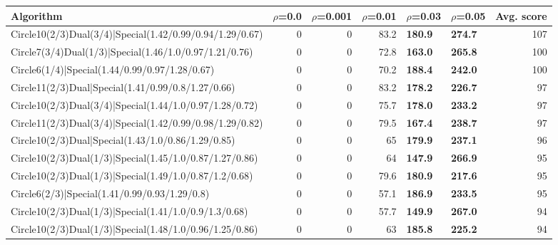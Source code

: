 \begin{tabular}{lrrrllr}
\hline
 Algorithm                                                      &   $\rho$=0.0 &   $\rho$=0.001 &   $\rho$=0.01 & $\rho$=0.03    & $\rho$=0.05    &   Avg. score \\
\hline
 Circle10(2/3)Dual(3/4)|Special(1.42/0.99/0.94/1.29/0.67)       &          0   &            0   &          83.2 & \textbf{180.9} & \textbf{274.7} &          107 \\
 Circle7(3/4)Dual(1/3)|Special(1.46/1.0/0.97/1.21/0.76)         &          0   &            0   &          72.8 & \textbf{163.0} & \textbf{265.8} &          100 \\
 Circle6(1/4)|Special(1.44/0.99/0.97/1.28/0.67)                 &          0   &            0   &          70.2 & \textbf{188.4} & \textbf{242.0} &          100 \\
 Circle11(2/3)Dual|Special(1.41/0.99/0.8/1.27/0.66)             &          0   &            0   &          83.2 & \textbf{178.2} & \textbf{226.7} &           97 \\
 Circle10(2/3)Dual(3/4)|Special(1.44/1.0/0.97/1.28/0.72)        &          0   &            0   &          75.7 & \textbf{178.0} & \textbf{233.2} &           97 \\
 Circle11(2/3)Dual(3/4)|Special(1.42/0.99/0.98/1.29/0.82)       &          0   &            0   &          79.5 & \textbf{167.4} & \textbf{238.7} &           97 \\
 Circle10(2/3)Dual|Special(1.43/1.0/0.86/1.29/0.85)             &          0   &            0   &          65   & \textbf{179.9} & \textbf{237.1} &           96 \\
 Circle10(2/3)Dual(1/3)|Special(1.45/1.0/0.87/1.27/0.86)        &          0   &            0   &          64   & \textbf{147.9} & \textbf{266.9} &           95 \\
 Circle10(2/3)Dual(1/3)|Special(1.49/1.0/0.87/1.2/0.68)         &          0   &            0   &          79.6 & \textbf{180.9} & \textbf{217.6} &           95 \\
 Circle6(2/3)|Special(1.41/0.99/0.93/1.29/0.8)                  &          0   &            0   &          57.1 & \textbf{186.9} & \textbf{233.5} &           95 \\
 Circle10(2/3)Dual(1/3)|Special(1.41/1.0/0.9/1.3/0.68)          &          0   &            0   &          57.7 & \textbf{149.9} & \textbf{267.0} &           94 \\
 Circle10(2/3)Dual(1/3)|Special(1.48/1.0/0.96/1.25/0.86)        &          0   &            0   &          63   & \textbf{185.8} & \textbf{225.2} &           94 \\

\end{tabular}

